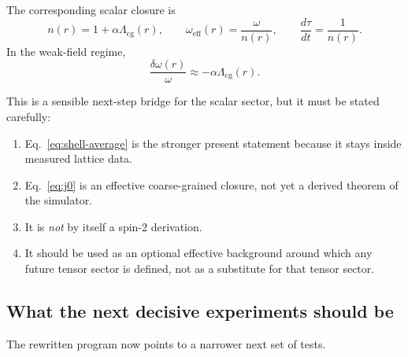 \documentclass[11pt]{article}
\begin{document}
The corresponding scalar closure is
\begin{equation}
n(r) = 1+\alpha \Lambda_{\mathrm{cg}}(r),
\qquad
\omega_{\mathrm{eff}}(r) = \frac{\omega}{n(r)},
\qquad
\frac{d\tau}{dt} = \frac{1}{n(r)}.
\label{eq:scalar-closure}
\end{equation}
In the weak-field regime,
\begin{equation}
\frac{\delta \omega(r)}{\omega}
\approx
-\alpha \Lambda_{\mathrm{cg}}(r).
\label{eq:redshift-weak}
\end{equation}

This is a sensible next-step bridge for the scalar sector, but it must be stated carefully:
\begin{enumerate}
    \item Eq.~\eqref{eq:shell-average} is the stronger present statement because it stays inside measured lattice data.
    \item Eq.~\eqref{eq:j0} is an effective coarse-grained closure, not yet a derived theorem of the simulator.
    \item It is \emph{not} by itself a spin-2 derivation.
    \item It should be used as an optional effective background around which any future tensor sector is defined, not as a substitute for that tensor sector.
\end{enumerate}

\subsection{What the next decisive experiments should be}

The rewritten program now points to a narrower next set of tests.
\end{document}
